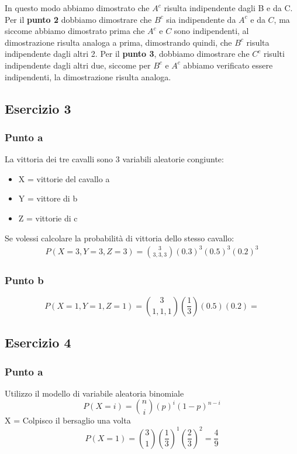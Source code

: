 \documentclass[12pt]{article}
\begin{document}
\newpage
In questo modo abbiamo dimostrato che \(A^c\) risulta indipendente dagli B e da C.
\newline
Per il \textbf{punto 2} dobbiamo dimostrare che \(B^c\) sia indipendente da \(A^c\) e da \(C\), ma siccome
abbiamo dimostrato prima che \(A^c\) e \(C\) sono indipendenti, al dimostrazione risulta analoga a prima, dimostrando quindi,
che \(B^c\) risulta indipendente dagli altri 2. 
Per il \textbf{punto 3}, dobbiamo dimostrare che \(C^c\) risulti indipendente dagli altri due, siccome per
\(B^c\) e \(A^c\) abbiamo verificato essere indipendenti, la dimostrazione risulta analoga.
\subsection*{Esercizio 3}
\subsubsection*{Punto a}

La vittoria dei tre cavalli sono 3 variabili aleatorie congiunte:
\begin{itemize}
    \item X = vittorie del cavallo a
    \item Y = vittore di b
    \item Z = vittorie di c
\end{itemize}

Se volessi calcolare la probabilità di vittoria dello stesso cavallo:
\begin{align*}
    P(X=3,Y=3,Z=3) = \binom{3}{3,3,3}\left(0.3\right)^3\left(0.5\right)^3\left(0.2\right)^3
\end{align*}

\subsubsection*{Punto b}
\[
    P(X=1,Y=1,Z=1) = \binom{3}{1,1,1}\left(\frac{1}{3}\right) \left(0.5\right) \left(0.2\right) =    
\]
\subsection*{Esercizio 4}
\subsubsection*{Punto a}
Utilizzo il modello di variabile aleatoria binomiale
\[
P(X=i) = \binom{n}{i} (p)^i (1-p)^{n-i}    
\]
X = Colpisco il bersaglio una volta
\[
P(X=1) = \binom{3}{1} \left(\frac{1}{3}\right)^1 \left(\frac{2}{3}\right)^2 = \frac{4}{9}   
\]  
\end{document}
